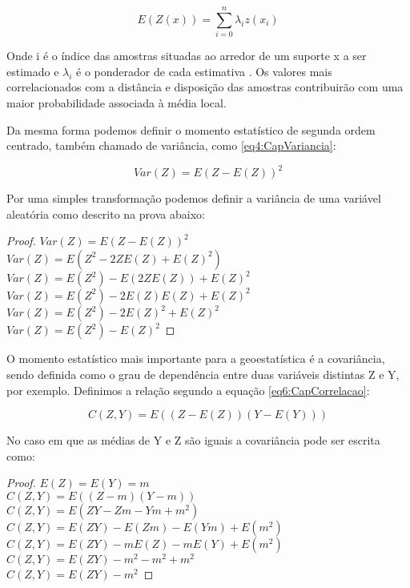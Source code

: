 \begin{equation}\label{eq3:Media_ponderada}
E\left(Z(x)\right)= \sum_{i=0}^{n}\lambda_iz(x_i)
\end{equation}

Onde i é o índice das amostras situadas ao arredor de um suporte x a ser estimado e $\lambda_i$ é o ponderador de cada estimativa . Os valores mais correlacionados com a distância e disposição das amostras contribuirão com uma maior probabilidade associada à média local.  

Da mesma forma podemos definir o momento estatístico de segunda ordem centrado, também chamado de variância, como \eqref{eq4:CapVariancia}:

\begin{equation}\label{eq4:CapVariancia}
Var\left(Z\right)= E\left( Z - E\left( Z\right) \right)^2
\end{equation} 

Por uma simples transformação podemos definir a variância de uma variável aleatória como descrito na prova abaixo:

\begin{proof} 	 
$Var\left( Z \right)= E\left( Z -E(Z) \right)^2$  \\
$Var\left(Z \right)= E\left( Z^2 -2ZE\left( Z\right)+ E(Z)^2 \right)$ \\
$Var\left(Z \right)= E(Z^2) -E(2ZE(Z)) +E(Z)^2$  \\
$Var\left(Z \right)= E(Z^2) -2E(Z)E(Z) +E(Z)^2$  \\
$Var\left(Z \right)= E(Z^2) -2E(Z)^2 +E(Z)^2$ \\
$Var\left(Z \right)= E(Z^2) - E(Z)^2$
\end{proof}

O momento estatístico mais importante para a geoestatística é a covariância, sendo definida como o grau de dependência entre duas variáveis distintas Z e Y, por exemplo. Definimos a relação segundo a equação \eqref{eq6:CapCorrelacao}: 

\begin{equation}\label{eq6:CapCorrelacao}
C\left(Z,Y\right)= E\left( (Z-E(Z)) (Y-E(Y)) \right)
\end{equation}

No caso em que as médias de Y e Z são iguais a covariância pode ser escrita como: 
\begin{proof}
$E(Z) = E(Y) = m $
\\$C\left(Z,Y\right)= E\left( (Z-m) (Y-m) \right)$
\\$C\left(Z,Y\right)= E\left( ZY - Zm - Ym +m^2 \right)$
\\$C\left(Z,Y\right)= E(ZY) - E(Zm) - E(Ym) +E(m^2) $
\\$C\left(Z,Y\right)= E(ZY) - mE(Z) - mE(Y) +E(m^2) $
\\$C\left(Z,Y\right)= E(ZY) - m^2 - m^2 +m^2$
\\$C\left(Z,Y\right)= E(ZY) - m^2$
\end{proof}

